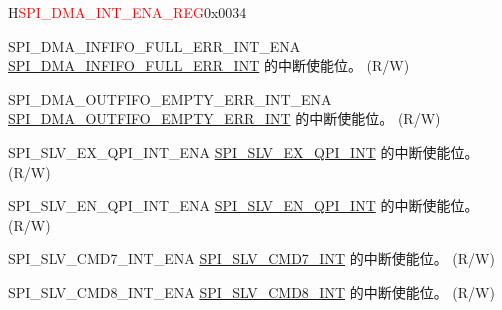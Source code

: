 \begin{register}{H}{\textcolor{red}{SPI\_DMA\_INT\_ENA\_REG}}{0x{}0034}\label{regdesc:SPIDMAINTENAREG}
%
%
%
%
%
%
%
%
%
%
%
%
%
%
%
%
%
%
%
%
%
%
\regnewline%
\begin{regdesc}\begin{reglist}
\label{fielddesc:SPIDMAINFIFOFULLERRINTENA}\item [SPI\_DMA\_INFIFO\_FULL\_ERR\_INT\_ENA] \hyperref[int:SPIINFIFOFULLERRINT]{SPI\_DMA\_INFIFO\_FULL\_ERR\_INT} 的中断使能位。 (R/W)
\label{fielddesc:SPIDMAOUTFIFOEMPTYERRINTENA}\item [SPI\_DMA\_OUTFIFO\_EMPTY\_ERR\_INT\_ENA] \hyperref[int:SPIOUTFIFOEMPTYERRINT]{SPI\_DMA\_OUTFIFO\_EMPTY\_ERR\_INT} 的中断使能位。 (R/W)
\label{fielddesc:SPISLVEXQPIINTENA}\item [SPI\_SLV\_EX\_QPI\_INT\_ENA] \hyperref[int:SPISLVEXQPIINT]{SPI\_SLV\_EX\_QPI\_INT} 的中断使能位。 (R/W)
\label{fielddesc:SPISLVENQPIINTENA}\item [SPI\_SLV\_EN\_QPI\_INT\_ENA] \hyperref[int:SPISLVENQPIINT]{SPI\_SLV\_EN\_QPI\_INT} 的中断使能位。 (R/W)
\label{fielddesc:SPISLVCMD7INTENA}\item [SPI\_SLV\_CMD7\_INT\_ENA] \hyperref[int:SPISLVCMD7INT]{SPI\_SLV\_CMD7\_INT} 的中断使能位。 (R/W)
\label{fielddesc:SPISLVCMD8INTENA}\item [SPI\_SLV\_CMD8\_INT\_ENA] \hyperref[int:SPISLVCMD8INT]{SPI\_SLV\_CMD8\_INT} 的中断使能位。 (R/W)

\end{reglist}
\end{regdesc}
\end{register}
